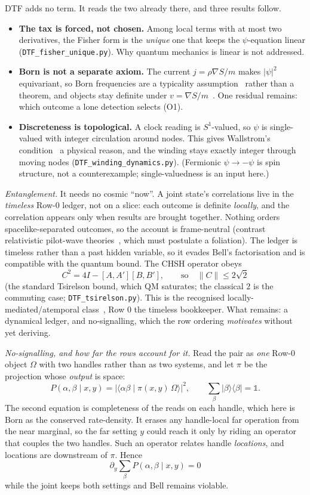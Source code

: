 \documentclass[11pt]{article}
\begin{document}
\medskip
\noindent DTF adds no term. It reads the two already there, and three results follow.
\begin{itemize}[leftmargin=1.4em,itemsep=3pt,topsep=3pt]
\item \textbf{The tax is forced, not chosen.} Among local terms with at most two derivatives, the Fisher form
  is the \emph{unique} one that keeps the $\psi$-equation linear (\texttt{DTF\_fisher\_unique.py}). Why
  quantum mechanics is linear is not addressed.
\item \textbf{Born is not a separate axiom.} The current $j=\rho\nabla S/m$ makes $|\psi|^2$ equivariant, so
  Born frequencies are a typicality assumption~\cite{DGZ1992,Valentini1991} rather than a theorem, and objects
  stay definite under $v=\nabla S/m$~\cite{Bohm1952}. One residual remains: which outcome a lone detection
  selects (O1).
\item \textbf{Discreteness is topological.} A clock reading is $S^1$-valued, so $\psi$ is single-valued with
  integer circulation around nodes. This gives Wallstrom's condition~\cite{Wallstrom1994} a physical reason,
  and the winding stays exactly integer through moving nodes (\texttt{DTF\_winding\_dynamics.py}).
  (Fermionic $\psi\to-\psi$ is spin structure, not a counterexample; single-valuedness is an input here.)
\end{itemize}

\emph{Entanglement.} It needs no cosmic ``now''. A joint state's correlations live in the \emph{timeless} Row-0 ledger,
not on a slice: each outcome is definite \emph{locally}, and the correlation appears only when results are
brought together. Nothing orders spacelike-separated outcomes, so the account is frame-neutral (contrast
relativistic pilot-wave theories~\cite{DGMZ1999,Tumulka2006}, which must postulate a foliation). The ledger is timeless rather than a past hidden variable, so it evades Bell's factorisation and is compatible with the quantum bound. The CHSH operator obeys
\[ C^2 = 4I-[A,A'][B,B'], \qquad \text{so}\quad \|C\|\le 2\sqrt2 \]
(the standard Tsirelson bound, which QM saturates; the classical $2$ is the commuting case;
\texttt{DTF\_tsirelson.py}). This is the recognised locally-mediated/atemporal
class~\cite{WhartonArgaman2020}, Row 0 the timeless bookkeeper. What remains: a dynamical ledger, and
no-signalling, which the row ordering \emph{motivates} without yet deriving.

\emph{No-signalling, and how far the rows account for it.} Read the pair as \emph{one} Row-0 object $\Omega$
with two handles rather than as two systems, and let $\pi$ be the projection whose \emph{output} is space:
\[ P(\alpha,\beta\mid x,y)=\big|\langle\alpha\beta\mid\pi(x,y)\,\Omega\rangle\big|^2 ,
   \qquad \sum_\beta|\beta\rangle\langle\beta|=\mathbb 1 . \]
The second equation is completeness of the reads on each handle, which here is Born as the conserved
rate-density. It erases any handle-local far operation from the near marginal, so the far setting $y$ could
reach it only by riding an operator that couples the two handles. Such an operator relates handle
\emph{locations}, and locations are downstream of $\pi$. Hence
\[ \partial_y\!\sum_\beta P(\alpha,\beta\mid x,y)=0 \]
while the joint keeps both settings and Bell remains violable.
\end{document}
